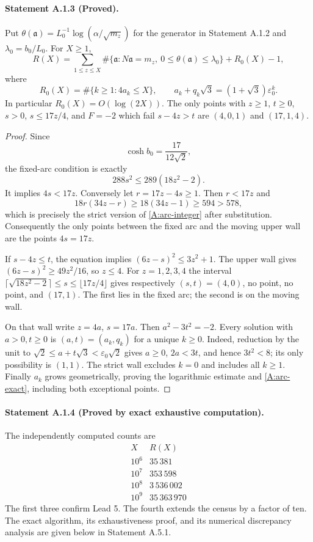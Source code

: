 \paragraph{Statement A.1.3 (Proved).}
Put $\theta(\mathfrak a)=L_0^{-1}\log(\alpha/\sqrt{m_z})$ for the generator
in Statement A.1.2 and $\lambda_0=b_0/L_0$. For $X\geq1$,
\begin{equation}\label{A:arc-exact}
 R(X)=\sum_{1\leq z\leq X}
 \#\{\mathfrak a:N\mathfrak a=m_z,\ 0\leq\theta(\mathfrak a)\leq\lambda_0\}
 +R_0(X)-1,
\end{equation}
where
\[
 R_0(X)=\#\{k\geq1:4a_k\leq X\},\qquad
 a_k+q_k\sqrt3=(1+\sqrt3)\varepsilon_0^k.
\]
In particular $R_0(X)=O(\log(2X))$. The only points with $z\geq1$,
$t\geq0$, $s>0$, $s\leq17z/4$, and $F=-2$ which fail $s-4z>t$ are
$(4,0,1)$ and $(17,1,4)$.
\begin{proof}
Since
\[
 \cosh b_0=\frac{17}{12\sqrt2},
\]
the fixed-arc condition is exactly
\begin{equation}\label{A:arc-integer}
 288s^2\leq289(18z^2-2).
\end{equation}
It implies $4s<17z$. Conversely let $r=17z-4s\geq1$. Then
$r<17z$ and
\[
 18r(34z-r)\geq18(34z-1)\geq594>578,
\]
which is precisely the strict version of \eqref{A:arc-integer} after
substitution. Consequently the only points between the fixed arc and
the moving upper wall are the points $4s=17z$.

If $s-4z\leq t$, the equation implies
$(6z-s)^2\leq3z^2+1$. The upper wall gives
$(6z-s)^2\geq49z^2/16$, so $z\leq4$. For $z=1,2,3,4$ the interval
$\lceil\sqrt{18z^2-2}\rceil\leq s\leq\lfloor17z/4\rfloor$
gives respectively $(s,t)=(4,0)$, no point, no point, and $(17,1)$.
The first lies in the fixed arc; the second is on the moving wall.

On that wall write $z=4a$, $s=17a$. Then $a^2-3t^2=-2$.
Every solution with $a>0,t\geq0$ is
$(a,t)=(a_k,q_k)$ for a unique $k\geq0$. Indeed, reduction by the unit to
$\sqrt2\leq a+t\sqrt3<\varepsilon_0\sqrt2$ gives
$a\geq0$, $2a<3t$, and hence $3t^2<8$; its only possibility is $(1,1)$.
The strict wall excludes $k=0$ and includes all $k\geq1$.
Finally $a_k$ grows geometrically, proving the logarithmic estimate and
\eqref{A:arc-exact}, including both exceptional points.
\end{proof}

\paragraph{Statement A.1.4 (Proved by exact exhaustive computation).}
The independently computed counts are
\[
 \begin{array}{c|r}
 X&R(X)\\\hline
 10^6&35\,381\\
 10^7&353\,598\\
 10^8&3\,536\,002\\
 10^9&35\,363\,970
 \end{array}
\]
The first three confirm Lead 5. The fourth extends the census by a factor
of ten. The exact algorithm, its exhaustiveness proof, and its numerical
discrepancy analysis are given below in Statement A.5.1.

